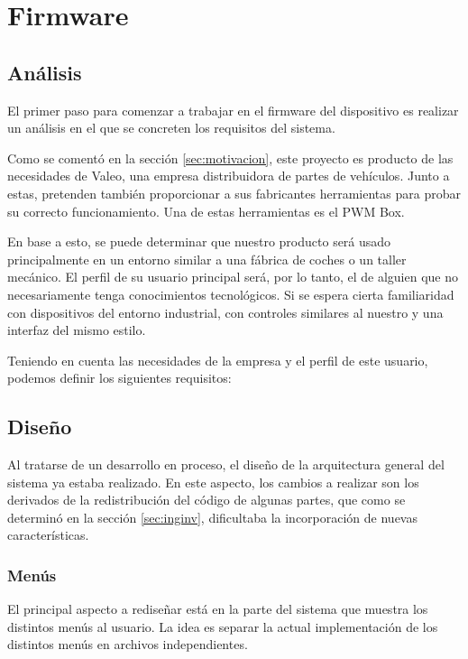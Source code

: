 \chapter{Firmware}
\label{ch:firmware}

\section{Análisis}
\label{sec:fw_analisis}

El primer paso para comenzar a trabajar en el firmware del dispositivo es realizar un análisis en el que se concreten los requisitos del sistema.

Como se comentó en la sección \ref{sec:motivacion}, este proyecto es producto de las necesidades de Valeo, una empresa distribuidora de partes de vehículos. Junto a estas, pretenden también proporcionar a sus fabricantes herramientas para probar su correcto funcionamiento. Una de estas herramientas es el PWM Box.

En base a esto, se puede determinar que nuestro producto será usado principalmente en un entorno similar a una fábrica de coches o un taller mecánico. El perfil de su usuario principal será, por lo tanto, el de alguien que no necesariamente tenga conocimientos tecnológicos. Si se espera cierta familiaridad con dispositivos del entorno industrial, con controles similares al nuestro y una interfaz del mismo estilo.

Teniendo en cuenta las necesidades de la empresa y el perfil de este usuario, podemos definir los siguientes requisitos:



\section{Diseño}

Al tratarse de un desarrollo en proceso, el diseño de la arquitectura general del sistema ya estaba realizado. En este aspecto, los cambios a realizar son los derivados de la redistribución del código de algunas partes, que como se determinó en la sección \ref{sec:inginv}, dificultaba la incorporación de nuevas características.

\subsection{Menús}

El principal aspecto a rediseñar está en la parte del sistema que muestra los distintos menús al usuario. La idea es separar la actual implementación de los distintos menús en archivos independientes.

